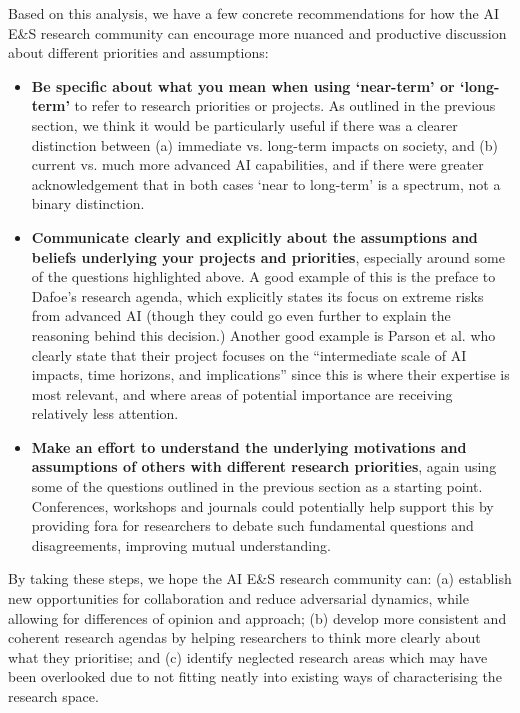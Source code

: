 \documentclass[sigconf]{acmart}
\begin{document}
Based on this analysis, we have a few concrete recommendations for how the AI E\&S research community can encourage more nuanced and productive discussion about different priorities and assumptions:

\begin{itemize}
    \item \textbf{Be specific about what you mean when using `near-term' or `long-term'} to refer to research priorities or projects. As outlined in the previous section, we think it would be particularly useful if there was a clearer distinction between (a) immediate vs. long-term impacts on society, and (b) current vs. much more advanced AI capabilities, and if there were greater acknowledgement that in both cases `near to long-term' is a spectrum, not a binary distinction.
    \item \textbf{Communicate clearly and explicitly about the assumptions and beliefs underlying your projects and priorities}, especially around some of the questions highlighted above. A good example of this is the preface to Dafoe's \cite{dafoe_ai_2018} research agenda, which explicitly states its focus on extreme risks from advanced AI (though they could go even further to explain the reasoning behind this decision.) Another good example is Parson et al. \cite{parson_artificial_2019} who clearly state that their project focuses on the ``intermediate scale of AI impacts, time horizons, and implications'' since this is where their expertise is most relevant, and where areas of potential importance are receiving relatively less attention.
    \item \textbf{Make an effort to understand the underlying motivations and assumptions of others with different research priorities}, again using some of the questions outlined in the previous section as a starting point. Conferences, workshops and journals could potentially help support this by providing fora for researchers to debate such fundamental questions and disagreements, improving mutual understanding.
\end{itemize}

By taking these steps, we hope the AI E\&S research community can: (a) establish new opportunities for collaboration and reduce adversarial dynamics, while allowing for differences of opinion and approach; (b) develop more consistent and coherent research agendas by helping researchers to think more clearly about what they prioritise; and (c) identify neglected research areas which may have been overlooked due to not fitting neatly into existing ways of characterising the research space.
\end{document}
